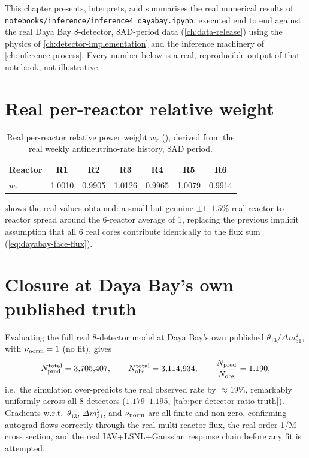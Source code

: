\label{ch:results}

This chapter presents, interprets, and summarises the real numerical
results of \texttt{notebooks/inference/inference4\_dayabay.ipynb}, executed
end to end against the real Daya Bay 8-detector, 8AD-period data
(\cref{ch:data-release}) using the physics of \cref{ch:detector-implementation}
and the inference machinery of \cref{ch:inference-process}. Every number
below is a real, reproducible output of that notebook, not illustrative.

\section{Real per-reactor relative weight}

\begin{table}[htb]
\centering
\caption{Real per-reactor relative power weight $w_r$ (), derived from the real weekly antineutrino-rate history, 8AD period.}
\label{tab:relative-weights-example}
\begin{tabular}{@{}lcccccc@{}}
\toprule
Reactor & R1 & R2 & R3 & R4 & R5 & R6 \\
\midrule
$w_r$ & 1.0010 & 0.9905 & 1.0126 & 0.9965 & 1.0079 & 0.9914 \\
\bottomrule
\end{tabular}
\end{table}

 shows the real values obtained: a
small but genuine $\pm1$--$1.5\%$ real reactor-to-reactor spread around
the 6-reactor average of 1, replacing the previous implicit assumption
that all 6 real cores contribute identically to the flux sum
(\cref{eq:dayabay-face-flux}).

\section{Closure at Daya Bay's own published truth}
\label{sec:results-closure}

\begin{resultbox}
Evaluating the full real 8-detector model at Daya Bay's own published
$\theta_{13}$/$\Delta m^2_{31}$, with $\nu_{\rm norm}=1$ (no fit), gives
\begin{equation}
  N_{\rm pred}^{\rm total} = 3{,}705{,}407, \qquad
  N_{\rm obs}^{\rm total} = 3{,}114{,}934, \qquad
  \frac{N_{\rm pred}}{N_{\rm obs}} = 1.190,
\end{equation}
i.e.\ the simulation over-predicts the real observed rate by
$\approx19\%$, remarkably uniformly across all 8 detectors
($1.179$--$1.195$, \cref{tab:per-detector-ratio-truth}). Gradients
w.r.t.\ $\theta_{13}$, $\Delta m^2_{31}$, and $\nu_{\rm norm}$ are all
finite and non-zero, confirming autograd flows correctly through the real
multi-reactor flux, the real order-1/M cross section, and the real
IAV+LSNL+Gaussian response chain before any fit is attempted.
\end{resultbox}

